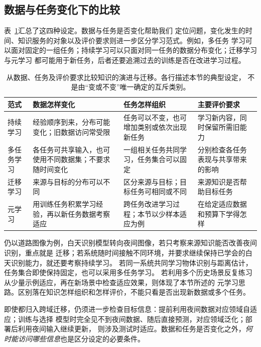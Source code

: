 \FloatBarrier
\subsection{数据与任务变化下的比较}
\label{sec:knowledge-evolution-comparison}

表~\ref{tab:knowledge-evolution-comparison}汇总了这四种设定。数据与任务是否变化帮助我们
定位问题，变化发生的时间、知识服务的对象以及评价要求则进一步区分学习范式。例如，多任务
学习可以面对固定的一组任务；持续学习可以只面对同一任务的数据分布变化；迁移学习与元学习
都可能用于新任务，后者还要追溯过去的训练是否在改进学习过程。

\begin{table}[htbp]
  \centering
  \small
  \begin{tabularx}{\linewidth}{@{}lXXX@{}}
    \toprule
    \textbf{范式} & \textbf{数据怎样变化} & \textbf{任务怎样组织} & \textbf{主要评价要求} \\
    \midrule
    持续学习 & 经验顺序到来，分布可能变化；旧数据访问常受限 & 任务可以不变，也可增加类别或依次出现新任务 & 学习新内容，同时保留所需旧能力 \\
    多任务学习 & 各任务可共享输入，也可使用不同数据集；不要求随时间变化 & 一组相关任务共同学习，任务集合可以固定 & 分别检查各任务表现与共享带来的影响 \\
    迁移学习 & 来源与目标的分布可以不同 & 区分来源与目标；目标任务可相同或不同 & 来源知识是否帮助目标任务 \\
    元学习 & 用训练任务积累学习经验，再以新任务数据考察适应 & 跨任务改进学习过程；本节以少样本适应为例 & 在给定适应数据和预算下学得怎样 \\
    \bottomrule
  \end{tabularx}
  \caption{从数据、任务及评价要求比较知识的演进与迁移。各行描述本节的典型设定，
  不是由“变或不变”唯一确定的互斥类别。}
  \label{tab:knowledge-evolution-comparison}
\end{table}
\FloatBarrier

仍以道路图像为例，白天识别模型转向夜间图像，若只考察来源知识能否改善夜间识别，重点就是
迁移；若系统随时间接触不同环境，并要求继续保持已学会的白天识别能力，就还要考察持续学习。
若同一系统共同学习物体识别与距离估计，任务集合即使保持固定，也可以采用多任务学习。
若利用多个历史场景反复练习从少量示例适应，再在新场景中检查适应效果，则体现了本节所述的
元学习思路。区别落在知识怎样组织和怎样评价，不能只看是否出现新数据或多个任务。

即使都归入跨域迁移，仍须进一步检查目标信息：提前利用夜间数据对应领域自适应；训练与选择
模型时完全见不到夜间数据、随后直接预测，对应领域泛化；部署后利用夜间输入继续更新，
则涉及测试时适应。数据和任务是否变化之外，\emph{何时能访问哪些信息}也是区分设定的必要条件。

